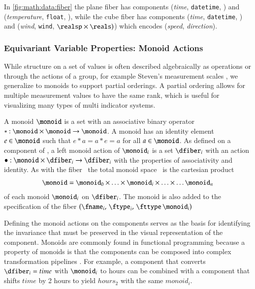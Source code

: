 \documentclass[journal]{vgtc}                %
\begin{document}
In \autoref{fig:math:data:fiber} the plane fiber has components (\emph{time}, \texttt{datetime}, \reals) and (\emph{temperature}, \texttt{float}, \reals), while the cube fiber has components (\emph{time}, \texttt{datetime}, \reals) and (\emph{wind}, \texttt{wind}, \(\realsp\times\reals)\)) which encodes (\emph{speed}, \emph{direction}). 


\subsubsection{Equivariant Variable Properties: Monoid Actions}
\label{sec:math:data:monoid}
While structure on a set of values is often described algebraically as operations or through the actions of a group, for example Steven's measurement scales \cite{stevensTheoryScalesMeasurement1946, leaFormalizationMeasurementScale}, we generalize to monoids to support partial orderings. A partial ordering allows for multiple measurement values to have the same rank\cite{fongInvitationAppliedCategory2019}, which is useful for visualizing many types of multi indicator systems\cite{bruggemannRankingPrioritizationMultiindicator2011}. 

A monoid \cite{Monoid2021} $\monoid$ is a set with an associative binary operator $\ast:\monoid \times \monoid\rightarrow \monoid$. A monoid has an identity element $e\in \monoid$ such that $e\ast a= a \ast e = a$ for all $a \in \monoid$. As defined on a component of \dfiber, a left monoid action \cite{SemigroupAction2021,nlab:action} of $\monoid_i$ is a set $\dfiber_i$ with an action $\bullet: \monoid\times \dfiber_i \rightarrow \dfiber_i$ with the properties of associativity and identity. As with the fiber \dfiber\, the total monoid space \monoid\ is the cartesian product
\begin{equation}\label{eq:math:data:monoid:decompose}
\monoid= \monoid_{0} \times \ldots \times \monoid_{i}\times \ldots \times\ldots \monoid_{n}
\end{equation}
of each monoid $\monoid_{i}$ on $\dfiber_{i}$.  The monoid is also added to the specification of the fiber $(\fname_i,\, \ftype_i,\, \fttype\, \monoid_i)$

Defining the monoid actions on the components serves as the basis for identifying the invariance\cite{kindlmannAlgebraicProcessVisualization2014} that must be preserved in the visual representation of the component. Monoids are commonly found in functional programming because a property of monoids is that the components can be composed into complex transformation pipelines \cite{yorgeyMonoidsThemeVariations}. For example, a component that converts \(\dfiber_i=time\) with \(\monoid_i\) to hours can be combined with a component that shifts \(time\) by 2 hours to yield \(hours_2\) with the same \(monoid_i\). 
\end{document}
